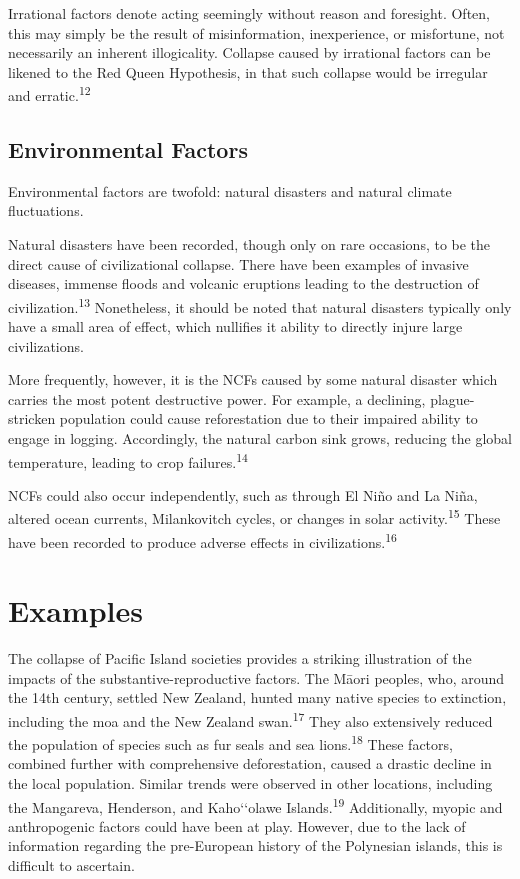 \documentclass[12pt]{article}
\begin{document}
Irrational factors denote acting seemingly without reason and foresight. Often, this may simply be the result of misinformation, inexperience, or misfortune, not necessarily an inherent illogicality. Collapse caused by irrational factors can be likened to the Red Queen Hypothesis, in that such collapse would be irregular and erratic.\textsuperscript{12}

\subsection{Environmental Factors}

Environmental factors are twofold: natural disasters and natural climate fluctuations.

Natural disasters have been recorded, though only on rare occasions, to be the direct cause of civilizational collapse. There have been examples of invasive diseases, immense floods and volcanic eruptions leading to the destruction of civilization.\textsuperscript{13} Nonetheless, it should be noted that natural disasters typically only have a small area of effect, which nullifies it ability to directly injure large civilizations.

More frequently, however, it is the NCFs caused by some natural disaster which carries the most potent destructive power. For example, a declining, plague-stricken population could cause reforestation due to their impaired ability to engage in logging. Accordingly, the natural carbon sink grows, reducing the global temperature, leading to crop failures.\textsuperscript{14}

NCFs could also occur independently, such as through El Ni\~no and La Ni\~na, altered ocean currents, Milankovitch cycles, or changes in solar activity.\textsuperscript{15} These have been recorded to produce adverse effects in civilizations.\textsuperscript{16}

\section{Examples}

The collapse of Pacific Island societies provides a striking illustration of the impacts of the substantive-reproductive factors. The M\=aori peoples, who, around the 14th century, settled New Zealand, hunted many native species to extinction, including the moa and the New Zealand swan.\textsuperscript{17} They also extensively reduced the population of species such as fur seals and sea lions.\textsuperscript{18} These factors, combined further with comprehensive deforestation, caused a drastic decline in the local population. Similar trends were observed in other locations, including the Mangareva, Henderson, and Kaho\char`‘olawe Islands.\textsuperscript{19} Additionally, myopic and anthropogenic factors could have been at play. However, due to the lack of information regarding the pre-European history of the Polynesian islands, this is difficult to ascertain.
\end{document}
